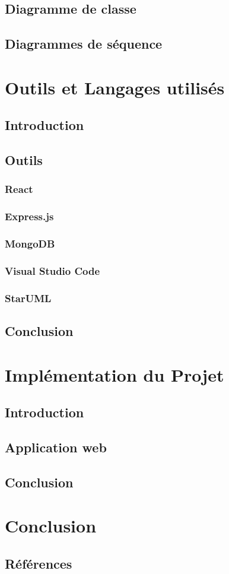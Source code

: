 \documentclass{report}
\begin{document}
\section{Diagramme de classe}
\section{Diagrammes de séquence}

\chapter{Outils et Langages utilisés}
\section{Introduction}
\section{Outils}
\subsection{React}
\subsection{Express.js}
\subsection{MongoDB}
\subsection{Visual Studio Code}
\subsection{StarUML}
\section{Conclusion}

\chapter{Implémentation du Projet}
\section{Introduction}
\section{Application web}
\section{Conclusion}



\chapter{Conclusion}

\section*{Références}
\end{document}
